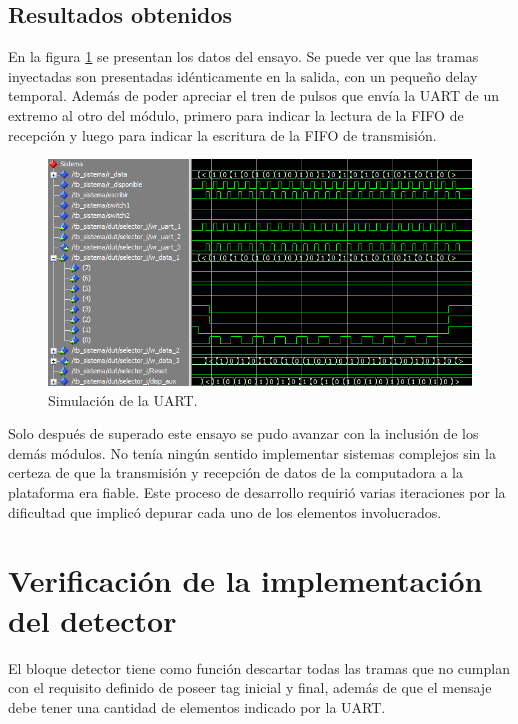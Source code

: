 	\subsection{Resultados obtenidos}
				
		En la figura \ref{fig:Test_UART} se presentan los datos del ensayo. Se puede ver que las tramas inyectadas son presentadas idénticamente en la salida, con un pequeño delay temporal. Además de poder apreciar el tren de pulsos que envía la UART de un extremo al otro del módulo, primero para indicar la lectura de la FIFO de recepción y luego para indicar la escritura de la FIFO de transmisión.
		
		\begin{figure}[h]
		\centering
		\includegraphics[scale=0.7]{./Figures/Test/UART}
			\caption{Simulación de la UART.}
			\label{fig:Test_UART}
		\end{figure}
			
		Solo después de superado este ensayo se pudo avanzar con la inclusión de los demás módulos. No tenía ningún sentido implementar sistemas complejos sin la certeza de que la transmisión y recepción de datos de la computadora a la plataforma era fiable. Este proceso de desarrollo requirió varias iteraciones por la dificultad que implicó depurar cada uno de los elementos involucrados.
	
\section{Verificación de la implementación del detector}

	El bloque detector tiene como función descartar todas las tramas que no cumplan con el requisito definido de poseer tag inicial y final, además de que el mensaje debe tener una cantidad de elementos indicado por la UART.
	
